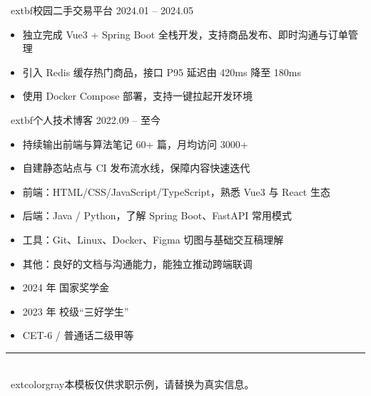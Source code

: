 \documentclass[UTF8,a4paper,10.5pt]{ctexart}
\begin{document}
\vspace{0.35em}
\	extbf{校园二手交易平台} \hfill 2024.01 -- 2024.05 \\
\begin{itemize}
  \item 独立完成 Vue3 + Spring Boot 全栈开发，支持商品发布、即时沟通与订单管理
  \item 引入 Redis 缓存热门商品，接口 P95 延迟由 420ms 降至 180ms
  \item 使用 Docker Compose 部署，支持一键拉起开发环境
\end{itemize}

\vspace{0.25em}
\	extbf{个人技术博客} \hfill 2022.09 -- 至今 \\
\begin{itemize}
  \item 持续输出前端与算法笔记 60+ 篇，月均访问 3000+
  \item 自建静态站点与 CI 发布流水线，保障内容快速迭代
\end{itemize}

\vspace{0.35em}
\begin{itemize}
  \item 前端：HTML/CSS/JavaScript/TypeScript，熟悉 Vue3 与 React 生态
  \item 后端：Java / Python，了解 Spring Boot、FastAPI 常用模式
  \item 工具：Git、Linux、Docker、Figma 切图与基础交互稿理解
  \item 其他：良好的文档与沟通能力，能独立推动跨端联调
\end{itemize}

\vspace{0.35em}
\begin{itemize}
  \item 2024 年 国家奖学金
  \item 2023 年 校级“三好学生”
  \item CET-6 / 普通话二级甲等
\end{itemize}

\vspace{0.4em}
{\color{lightline}\rule{\	extwidth}{0.6pt}}\\[0.35em]
{\small\	extcolor{gray}{本模板仅供求职示例，请替换为真实信息。}}
\end{document}
